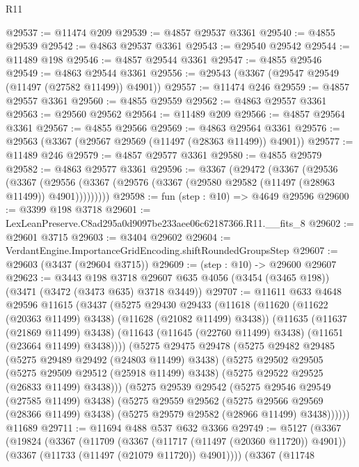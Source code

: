 \begin{lexlean}{R11}
\begin{coremodule}
@29537 := @11474 @209
@29539 := @4857 @29537 @3361
@29540 := @4855 @29539
@29542 := @4863 @29537 @3361
@29543 := @29540 @29542
@29544 := @11489 @198
@29546 := @4857 @29544 @3361
@29547 := @4855 @29546
@29549 := @4863 @29544 @3361
@29556 := @29543 (@3367 (@29547 @29549 (@11497 (@27582 @11499)) @4901))
@29557 := @11474 @246
@29559 := @4857 @29557 @3361
@29560 := @4855 @29559
@29562 := @4863 @29557 @3361
@29563 := @29560 @29562
@29564 := @11489 @209
@29566 := @4857 @29564 @3361
@29567 := @4855 @29566
@29569 := @4863 @29564 @3361
@29576 := @29563 (@3367 (@29567 @29569 (@11497 (@28363 @11499)) @4901))
@29577 := @11489 @246
@29579 := @4857 @29577 @3361
@29580 := @4855 @29579
@29582 := @4863 @29577 @3361
@29596 := @3367
    (@29472
      (@3367
        (@29536
          (@3367
            (@29556 (@3367 (@29576 (@3367 (@29580 @29582 (@11497 (@28963 @11499)) @4901)))))))))
@29598 := fun (step : @10) => @4649 @29596
@29600 := @3399 @198 @3718
@29601 := LexLeanPreserve.C8ad295a0d9097be233aee06c62187366.R11.__fits_8
@29602 := @29601 @3715
@29603 := @3404 @29602
@29604 := VerdantEngine.ImportanceGridEncoding.shiftRoundedGroupsStep
@29607 := @29603 (@3437 (@29604 @3715))
@29609 := (step : @10) -> @29600 @29607
@29623 := @3443
    @198
    @3718
    @29607
    @635
    @4056
    (@3454 (@3465 @198))
    (@3471 (@3472 (@3473 @635) @3718 @3449))
@29707 := @11611
    @633
    @4648
    @29596
    @11615
    (@3437
      (@5275
        @29430
        @29433
        (@11618
          (@11620 (@11622 (@20363 @11499) @3438) (@11628 (@21082 @11499) @3438))
          (@11635
            (@11637 (@21869 @11499) @3438)
            (@11643 (@11645 (@22760 @11499) @3438) (@11651 (@23664 @11499) @3438))))
        (@5275
          @29475
          @29478
          (@5275
            @29482
            @29485
            (@5275 @29489 @29492 (@24803 @11499) @3438)
            (@5275
              @29502
              @29505
              (@5275 @29509 @29512 (@25918 @11499) @3438)
              (@5275 @29522 @29525 (@26833 @11499) @3438)))
          (@5275
            @29539
            @29542
            (@5275 @29546 @29549 (@27585 @11499) @3438)
            (@5275
              @29559
              @29562
              (@5275 @29566 @29569 (@28366 @11499) @3438)
              (@5275 @29579 @29582 (@28966 @11499) @3438))))))
    @11689
@29711 := @11694 @488 @537 @632 @3366
@29749 := @5127
    (@3367
      (@19824
        (@3367
          (@11709
            (@3367 (@11717 (@11497 (@20360 @11720)) @4901))
            (@3367 (@11733 (@11497 (@21079 @11720)) @4901))))
        (@3367
          (@11748

\end{coremodule}
\end{lexlean}
